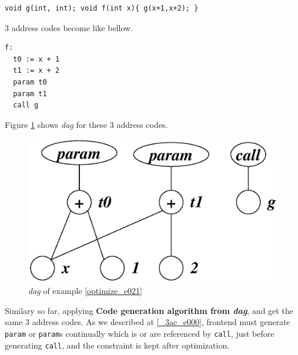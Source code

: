 \begin{Example}
\label{optimize_e021}
\begin{verbatim}
void g(int, int); void f(int x){ g(x+1,x+2); }
\end{verbatim}
3 address codes become like bellow.
\begin{verbatim}
f:
  t0 := x + 1
  t1 := x + 2
  param t0
  param t1
  call g
\end{verbatim}
Figure \ref{optimize_e022} shows {\em dag} for these 3 address codes.
\begin{figure}[htbp]
\begin{center}
\includegraphics[width=0.8\linewidth,height=0.470\linewidth]{opt009.eps}
\caption{{\em dag} of example \ref{optimize_e021}}
\label{optimize_e022}
\end{center}
\end{figure}
Similary so far, applying {\bf Code generation algorithm from {\em
 dag}}, and get the same 3 address codes.
As we described at \ref{_3ac_e000}, frontend must 
generate {\tt{param}} or {\tt{param}}s continually
which is or are referenced by {\tt{call}}, just before generating
{\tt{call}}, and the constraint is kept after optimization.
\end{Example}

